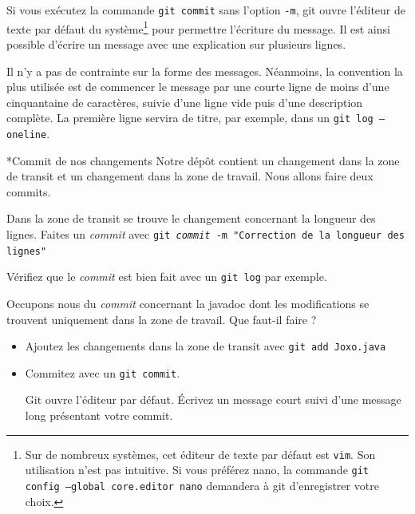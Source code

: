 \documentclass[a4paper,11pt]{style-esi/td}
\begin{document}
Si vous exécutez la commande \texttt{git commit} sans l’option \texttt{-m}, git
ouvre l’éditeur de texte par défaut du système\footnote{Sur de nombreux
	systèmes, cet éditeur de texte par défaut est \texttt{vim}. Son utilisation
	n’est pas intuitive. Si vous préférez nano, la commande \texttt{git config
	--global core.editor nano} demandera à git d'enregistrer votre choix.
} pour permettre l’écriture du message. Il est ainsi possible d’écrire un
message avec une explication sur plusieurs lignes. 

Il n’y a pas de contrainte sur la forme des messages. Néanmoins, la convention
la plus utilisée est de commencer le message par une courte ligne de moins
d’une cinquantaine de caractères, suivie d’une ligne vide puis d’une
description complète. La première ligne servira de titre, par exemple, dans un
\texttt{git log --oneline}. 



\begin{Exercice}*{Commit de nos changements}
	Notre dépôt contient un changement dans la zone de transit et un changement
	dans la zone de travail. Nous allons faire deux commits. 
	\begin{steps}
		
	\item Dans la zone de transit se trouve le changement concernant la
		longueur des lignes. Faites un \textit{commit} avec \texttt{git
			\textit{commit} -m "Correction de la longueur des lignes"}

		Vérifiez que le \textit{commit} est bien fait avec un \texttt{git log} par
		exemple. 

	\item Occupons nous du \textit{commit} concernant la javadoc dont les
		modifications se trouvent uniquement dans la zone de travail. Que
		faut-il faire ? 

		\begin{itemize}

			\item Ajoutez les changements dans la zone de transit avec
				\texttt{git add Joxo.java}

			\item Commitez avec un \texttt{git commit}.

				Git ouvre l'éditeur par défaut. Écrivez un message court suivi
				d'une message long présentant votre commit. 

		\end{itemize}

	\end{steps}
\end{Exercice}
\end{document}
